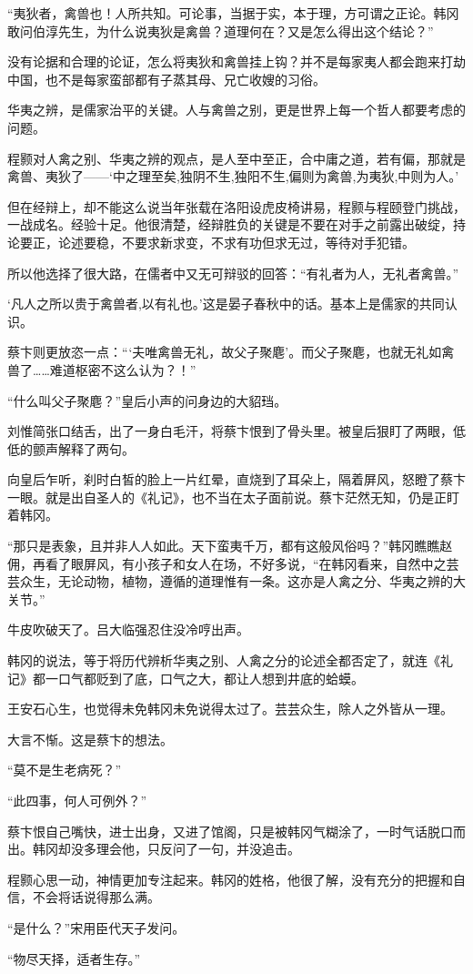 “夷狄者，禽兽也！人所共知。可论事，当据于实，本于理，方可谓之正论。韩冈敢问伯淳先生，为什么说夷狄是禽兽？道理何在？又是怎么得出这个结论？”

没有论据和合理的论证，怎么将夷狄和禽兽挂上钩？并不是每家夷人都会跑来打劫中国，也不是每家蛮部都有子蒸其母、兄亡收嫂的习俗。

华夷之辨，是儒家治平的关键。人与禽兽之别，更是世界上每一个哲人都要考虑的问题。

程颢对人禽之别、华夷之辨的观点，是人至中至正，合中庸之道，若有偏，那就是禽兽、夷狄了——‘中之理至矣,独阴不生,独阳不生,偏则为禽兽,为夷狄,中则为人。’

但在经辩上，却不能这么说当年张载在洛阳设虎皮椅讲易，程颢与程颐登门挑战，一战成名。经验十足。他很清楚，经辩胜负的关键是不要在对手之前露出破绽，持论要正，论述要稳，不要求新求变，不求有功但求无过，等待对手犯错。

所以他选择了很大路，在儒者中又无可辩驳的回答：“有礼者为人，无礼者禽兽。”

‘凡人之所以贵于禽兽者,以有礼也。’这是晏子春秋中的话。基本上是儒家的共同认识。

蔡卞则更放恣一点：“‘夫唯禽兽无礼，故父子聚麀’。而父子聚麀，也就无礼如禽兽了……难道枢密不这么认为？！”

“什么叫父子聚麀？”皇后小声的问身边的大貂珰。

刘惟简张口结舌，出了一身白毛汗，将蔡卞恨到了骨头里。被皇后狠盯了两眼，低低的颤声解释了两句。

向皇后乍听，刹时白皙的脸上一片红晕，直烧到了耳朵上，隔着屏风，怒瞪了蔡卞一眼。就是出自圣人的《礼记》，也不当在太子面前说。蔡卞茫然无知，仍是正盯着韩冈。

“那只是表象，且并非人人如此。天下蛮夷千万，都有这般风俗吗？”韩冈瞧瞧赵佣，再看了眼屏风，有小孩子和女人在场，不好多说，“在韩冈看来，自然中之芸芸众生，无论动物，植物，遵循的道理惟有一条。这亦是人禽之分、华夷之辨的大关节。”

牛皮吹破天了。吕大临强忍住没冷哼出声。

韩冈的说法，等于将历代辨析华夷之别、人禽之分的论述全都否定了，就连《礼记》都一口气都贬到了底，口气之大，都让人想到井底的蛤蟆。

王安石心生，也觉得未免韩冈未免说得太过了。芸芸众生，除人之外皆从一理。

大言不惭。这是蔡卞的想法。

“莫不是生老病死？”

“此四事，何人可例外？”

蔡卞恨自己嘴快，进士出身，又进了馆阁，只是被韩冈气糊涂了，一时气话脱口而出。韩冈却没多理会他，只反问了一句，并没追击。

程颢心思一动，神情更加专注起来。韩冈的姓格，他很了解，没有充分的把握和自信，不会将话说得那么满。

“是什么？”宋用臣代天子发问。

“物尽天择，适者生存。”

